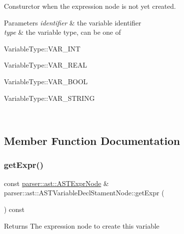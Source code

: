 Consturctor when the expression node is not yet created. 
\begin{DoxyParams}{Parameters}
{\em identifier} & the variable identifier \\
\hline
{\em type} & the variable type, can be one of
\begin{DoxyItemize}
\item {\ttfamily Variable\+Type\+::\+V\+A\+R\+\_\+\+I\+NT}
\item {\ttfamily Variable\+Type\+::\+V\+A\+R\+\_\+\+R\+E\+AL}
\item {\ttfamily Variable\+Type\+::\+V\+A\+R\+\_\+\+B\+O\+OL}
\item {\ttfamily Variable\+Type\+::\+V\+A\+R\+\_\+\+S\+T\+R\+I\+NG} 
\end{DoxyItemize}\\
\hline
\end{DoxyParams}


\subsection{Member Function Documentation}
\mbox{\label{classparser_1_1ast_1_1ASTVariableDeclStamentNode_a7275ed311f4ec6d6b28e5ab9804fa8fd}} 
\subsubsection{\texorpdfstring{get\+Expr()}{getExpr()}}
{\footnotesize\ttfamily const \hyperlink{classparser_1_1ast_1_1ASTExprNode}{parser\+::ast\+::\+A\+S\+T\+Expr\+Node} \& parser\+::ast\+::\+A\+S\+T\+Variable\+Decl\+Stament\+Node\+::get\+Expr (\begin{DoxyParamCaption}{ }\end{DoxyParamCaption}) const}

\begin{DoxyReturn}{Returns}
The expression node to create this variable 
\end{DoxyReturn}
\mbox{\label{classparser_1_1ast_1_1ASTVariableDeclStamentNode_a12050d4fc8fff18ddc605642013b8eb4}} 
